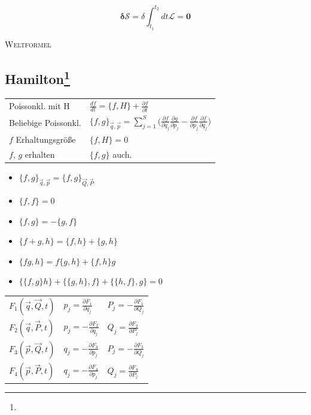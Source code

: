 \documentclass[12pt,a4paper, twoside]{article}
\renewcommand{\d}[2]{\frac{d #1}{d #2}}
\newcommand{\pd}[2]{\frac{\partial #1}{\partial #2}}
\renewcommand{\=}[1]{\stackrel{#1}{=}}
\theoremstyle{definition}
\theoremstyle{remark}
\begin{document}
\begin{framed}
\noindent
$$\mathbf{\delta \mathcal{S} =} \delta \int_{t_1}^{t_2} dt \mathscr{L}\mathbf{= 0}$$
\begin{center}\textsc{Weltformel}\end{center}
\end{framed}

\newpage
\subsection[Hamilton]{Hamilton\let\thefootnote\relax\footnote{}}

\begin{framed}
\begin{tabular}{ll}
Poissonkl. mit H & $\d{f}{t} = \{f, H\} + \pd{f}{t}$\\
Beliebige Poissonkl. & $\{f, g\}_{\vec{q}, \vec{p}} = \sum_{j=1}^S \Big( \pd{f}{q_j} \pd{g}{p_j} - \pd{f}{p_j} \pd{f}{q_j}\Big)$\\
$f$ Erhaltungsgröße & $\{f, H\} = 0$\\
$f$, $g$ erhalten & $\{f, g\}$ auch.\\
\end{tabular}
\end{framed}

\begin{center}
\begin{framed}
\begin{itemize}
\itemsep-0.5em
\item $\{f,g\}_{\vec{q}, \vec{p}} = \{f,g\}_{\vec{Q}, \vec{P}}$
\item $\{f, f\} = 0$
\item $\{f,g\} = -\{g, f\}$
\item $\{f+g, h\} = \{f,h\} + \{g, h\}$
\item $\{fg, h\} = f\{g,h\} + \{f,h\}g$
\item $\{\{f,g\}h\} + \{\{g,h\}, f\} + \{\{h,f\}, g\} = 0$
\end{itemize}
\end{framed}
\end{center}

\begin{center}
\begin{framed}
\begin{tabular}{l|l|l}
$F_1(\vec{q}, \vec{Q}, t)$ & $p_j = \pd{F_1}{q_j}$ & $P_j = - \pd{F_1}{Q_j}$\\
$F_2(\vec{q}, \vec{P}, t)$ & $p_j = -\pd{F_2}{q_j}$ & $Q_j = \pd{F_2}{P_j}$\\
$F_3(\vec{p}, \vec{Q}, t)$ & $q_j = -\pd{F_3}{p_j}$ & $P_j = - \pd{F_3}{Q_j}$\\
$F_4(\vec{p}, \vec{P}, t)$ & $q_j = -\pd{F_4}{p_j}$ & $Q_j = \pd{F_4}{P_j}$\\
\end{tabular}
\end{framed}
\end{center}
\end{document}
